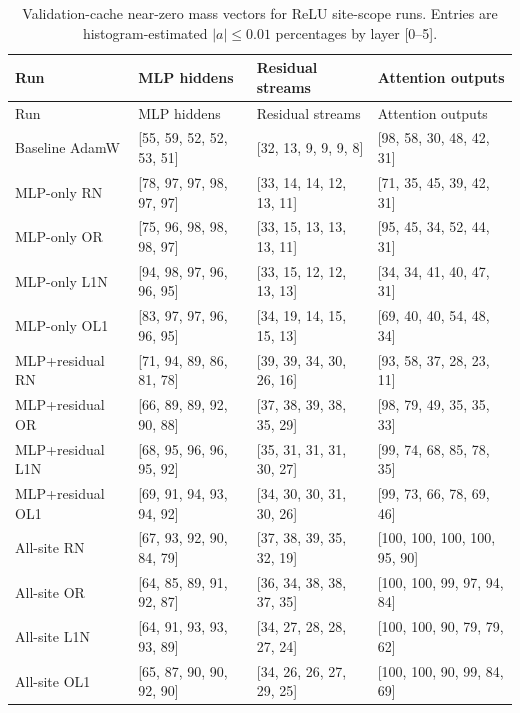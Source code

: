 \documentclass[10pt]{article}
\newcommand{\nzvec}[6]{[#1, #2, #3, #4, #5, #6]}
\begin{document}
\begin{longtable}{p{}p{}p{}p{}}
\caption{Validation-cache near-zero mass vectors for ReLU site-scope runs. Entries are histogram-estimated \(|a|\le0.01\) percentages by layer [0--5].}\\
\toprule
Run & MLP hiddens & Residual streams & Attention outputs \\
\midrule
\endfirsthead
\toprule
Run & MLP hiddens & Residual streams & Attention outputs \\
\midrule
\endhead
Baseline AdamW & \nzvec{55}{59}{52}{52}{53}{51} & \nzvec{32}{13}{9}{9}{9}{8} & \nzvec{98}{58}{30}{48}{42}{31} \\
MLP-only RN & \nzvec{78}{97}{97}{98}{97}{97} & \nzvec{33}{14}{14}{12}{13}{11} & \nzvec{71}{35}{45}{39}{42}{31} \\
MLP-only OR & \nzvec{75}{96}{98}{98}{98}{97} & \nzvec{33}{15}{13}{13}{13}{11} & \nzvec{95}{45}{34}{52}{44}{31} \\
MLP-only L1N & \nzvec{94}{98}{97}{96}{96}{95} & \nzvec{33}{15}{12}{12}{13}{13} & \nzvec{34}{34}{41}{40}{47}{31} \\
MLP-only OL1 & \nzvec{83}{97}{97}{96}{96}{95} & \nzvec{34}{19}{14}{15}{15}{13} & \nzvec{69}{40}{40}{54}{48}{34} \\
MLP+residual RN & \nzvec{71}{94}{89}{86}{81}{78} & \nzvec{39}{39}{34}{30}{26}{16} & \nzvec{93}{58}{37}{28}{23}{11} \\
MLP+residual OR & \nzvec{66}{89}{89}{92}{90}{88} & \nzvec{37}{38}{39}{38}{35}{29} & \nzvec{98}{79}{49}{35}{35}{33} \\
MLP+residual L1N & \nzvec{68}{95}{96}{96}{95}{92} & \nzvec{35}{31}{31}{31}{30}{27} & \nzvec{99}{74}{68}{85}{78}{35} \\
MLP+residual OL1 & \nzvec{69}{91}{94}{93}{94}{92} & \nzvec{34}{30}{30}{31}{30}{26} & \nzvec{99}{73}{66}{78}{69}{46} \\
All-site RN & \nzvec{67}{93}{92}{90}{84}{79} & \nzvec{37}{38}{39}{35}{32}{19} & \nzvec{100}{100}{100}{100}{95}{90} \\
All-site OR & \nzvec{64}{85}{89}{91}{92}{87} & \nzvec{36}{34}{38}{38}{37}{35} & \nzvec{100}{100}{99}{97}{94}{84} \\
All-site L1N & \nzvec{64}{91}{93}{93}{93}{89} & \nzvec{34}{27}{28}{28}{27}{24} & \nzvec{100}{100}{90}{79}{79}{62} \\
All-site OL1 & \nzvec{65}{87}{90}{90}{92}{90} & \nzvec{34}{26}{26}{27}{29}{25} & \nzvec{100}{100}{90}{99}{84}{69} \\
\bottomrule
\end{longtable}
\end{document}
